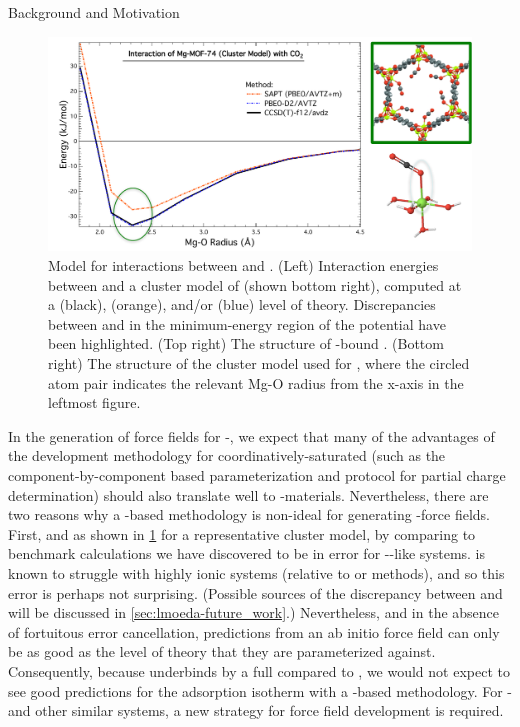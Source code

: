 \begin{section}{Background and Motivation}
    \begin{figure}
    \centering
    \includegraphics[width=1.0\textwidth]{lmoeda/sapt_breakdown.pdf}
    \caption[Model \pes for interactions between \co and \mgmof]
{
Model \pes for interactions between \co and \mgmof.  (Left) Interaction
energies between \co and a cluster model of \mgmof (shown bottom right),
computed at a \ccsdtf (black), \sapt (orange), and/or \pbeod (blue) level of
theory. Discrepancies
between \sapt and \ccsdtf in the minimum-energy region of the potential have
been highlighted. (Top right)
The structure of \co-bound \mgmof. (Bottom right) The structure of the cluster
model used for \mgmof, where the circled atom pair indicates the relevant Mg-O
radius from the x-axis in the leftmost figure.
            }
    \label{fig:lmoeda-sapt_breakdown}
    \end{figure}


In the generation of force fields for \cus-\mofs, we expect that many of the
advantages of the development methodology for coordinatively-saturated \mofs (such as the component-by-component based
parameterization and protocol for partial charge determination) should also translate
well to \cus-\mof materials. 
Nevertheless, there are two reasons why a \sapt-based methodology
is non-ideal for generating \cus-\mof force fields. First, and as shown in
\cref{fig:lmoeda-sapt_breakdown} for a representative \mgmof cluster model,
by comparing to benchmark \ccsdtf calculations we have discovered \sapt to be
in error for \cus-\mof-like systems.
\dftsapt is known to struggle with highly
ionic systems (relative to \ccsdt or \dft
methods),\cite{Lao2015a,Pastorczak2017} and so this error is perhaps not surprising.
(Possible sources of the discrepancy between \sapt and \ccsdtf will be
discussed in \cref{sec:lmoeda-future_work}.) Nevertheless, and in the absence of
fortuitous error cancellation,
predictions from an ab initio force field can only be
as good as the
level of theory that they are parameterized against. Consequently, because
\sapt underbinds \co 
by a full  compared to \ccsdtf, we would not expect to see
good predictions for the \co adsorption isotherm with a \sapt-based
methodology. For \cus-\mofs and other similar systems, a new strategy for force field development is required.


\end{section}
